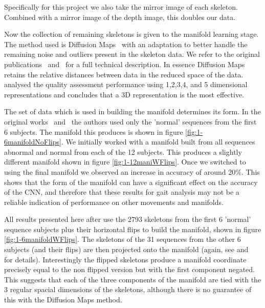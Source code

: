 \documentclass[11pt]{article} %
\begin{document}
Specifically for this project we also take the mirror image of each skeleton. Combined with a mirror image of the depth image, this doubles our data. 

Now the collection of remaining skeletons is given to the manifold learning stage. The method used is Diffusion Maps~\cite{Coifman2006} with an adaptation to better handle the remaining noise and outliers present in the skeleton data. We refer to the original publications~\cite{Paiement} and~\cite{Tao} for a full technical description. In essence Diffusion Maps retains the relative distances between data in the reduced space of the data. \cite{Tao} analysed the quality assessment performance using 1,2,3,4, and 5 dimensional representations and concludes that a 3D representation is the most effective.

The set of data which is used in building the manifold determines its form. In the original works~\cite{Paiement} and~\cite{Tao} the authors used only the 'normal' sequences from the first 6 subjects. The manifold this produces is shown in figure \ref{fig:1-6manifoldNoFlips}. We initially worked with a manifold built from all sequences abnormal and normal from each of the 12 subjects. This produces a slightly different manifold shown in figure \ref{fig:1-12maniWFlips}. Once we switched to using the final manifold we observed an increase in accuracy of around 20\%. This shows that the form of the manifold can have a significant effect on the accuracy of the CNN, and therefore that these results for gait analysis may not be a reliable indication of performance on other movements and manifolds.

All results presented here after use the 2793 skeletons from the first 6 'normal' sequence subjects plus their horizontal flips to build the manifold, shown in figure \ref{fig:1-6manifoldWFlips}. The skeletons of the 31 sequences from the other 6 subjects (and their flips) are then projected onto the manifold (again, see \cite{Paiement} and~\cite{Tao} for details). Interestingly the flipped skeletons produce a manifold coordinate precisely equal to the non flipped version but with the first component negated. This suggests that each of the three components of the manifold are tied with the 3 regular spacial dimensions of the skeletons, although there is no guarantee of this with the Diffusion Maps method. 
\end{document}

